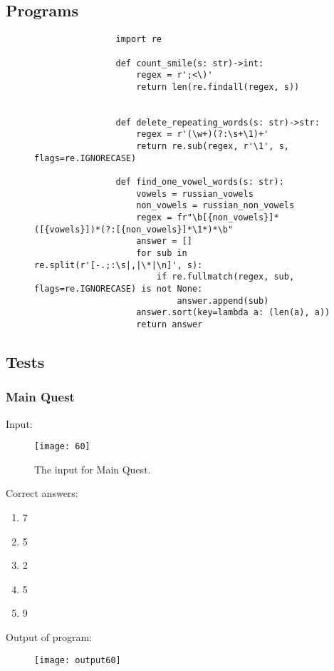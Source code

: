 \documentclass[12pt]{article}
\begin{document}
	\subsection{\LARGE Programs}
	\begin{figure}[H]
		\setlength{\fboxsep}{0pt}
		\setlength{\fboxrule}{0pt}
		\begin{center}
			\begin{lstlisting}
				import re
				
				def count_smile(s: str)->int:
					regex = r';<\)'
					return len(re.findall(regex, s))
				
				
				def delete_repeating_words(s: str)->str:
					regex = r'(\w+)(?:\s+\1)+'
					return re.sub(regex, r'\1', s, flags=re.IGNORECASE)
				
				def find_one_vowel_words(s: str):
					vowels = russian_vowels
					non_vowels = russian_non_vowels
					regex = fr"\b[{non_vowels}]*([{vowels}])*(?:[{non_vowels}]*\1*)*\b"
					answer = []
					for sub in re.split(r'[-.;:\s|,|\*|\n]', s):
						if re.fullmatch(regex, sub, flags=re.IGNORECASE) is not None:
							answer.append(sub)
					answer.sort(key=lambda a: (len(a), a))
					return answer
			\end{lstlisting}
		\end{center}
	\end{figure}
	\newpage
	\subsection{\LARGE Tests}
	\subsubsection{\LARGE Main Quest}
	Input:
	\begin{figure}[H]
		\texttt{[image: 60]}
		\caption{The input for Main Quest.}
		\label{fig:60}
	\end{figure}
	Correct answers:
	\begin{enumerate}
		\item 7
		\item 5
		\item 2
		\item 5
		\item 9
	\end{enumerate}
	Output of program:
	\begin{figure}[H]
		\texttt{[image: output60]}
		\label{fig:out60}
	\end{figure}
\end{document}
